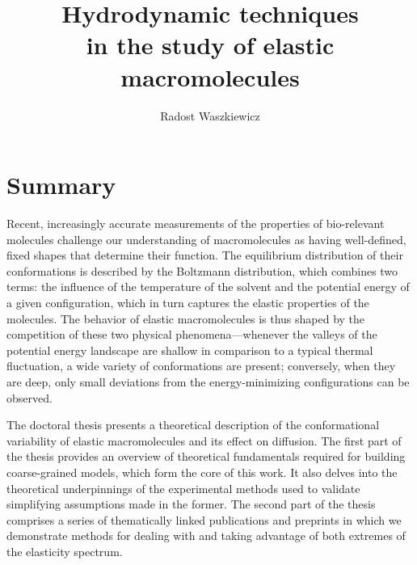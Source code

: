 \documentclass[physics]{doctoral}
\title{Hydrodynamic techniques\\in the study of elastic macromolecules}
\author{Radost Waszkiewicz}
\affiliation{University of Warsaw\\Faculty of Physics}
\begin{document}
\maketitle
{}

\section*{Summary}
Recent, increasingly accurate measurements of the properties of bio-relevant molecules challenge our understanding of macromolecules as having well-defined, fixed shapes that determine their function.
The equilibrium distribution of their conformations is described by the Boltzmann distribution, which combines two terms: the influence of the temperature of the solvent and the potential energy of a given configuration, which in turn captures the elastic properties of the molecules.
The behavior of elastic macromolecules is thus shaped by the competition of these two physical phenomena---whenever the valleys of the potential energy landscape are shallow in comparison to a typical thermal fluctuation, a wide variety of conformations are present; conversely, when they are deep, only small deviations from the energy-minimizing configurations can be observed.

The doctoral thesis presents a theoretical description of the conformational variability of elastic macromolecules and its effect on diffusion.
The first part of the thesis provides an overview of theoretical fundamentals required for building coarse-grained models, which form the core of this work.
It also delves into the theoretical underpinnings of the experimental methods used to validate simplifying assumptions made in the former.
The second part of the thesis comprises a series of thematically linked publications and preprints in which we demonstrate methods for dealing with and taking advantage of both extremes of the elasticity spectrum.
\end{document}
